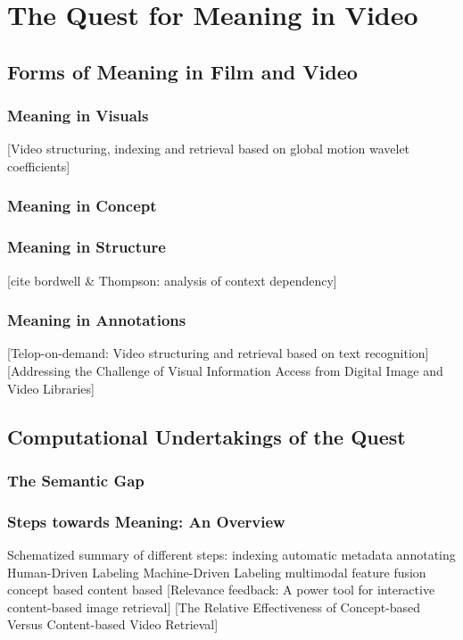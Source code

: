 \chapter{The Quest for Meaning in Video}
\label{ch:quest}

\section{Forms of Meaning in Film and Video}

\subsection{Meaning in Visuals}
[Video structuring, indexing and retrieval based on global motion wavelet coefficients]\cite{Bruno:2002tt}


\subsection{Meaning in Concept}
\subsection{Meaning in Structure}
[cite bordwell \& Thompson: analysis of context dependency]

\subsection{Meaning in Annotations}
[Telop-on-demand: Video structuring and retrieval based on text recognition]\cite{Kuwano:2000wy}
[Addressing the Challenge of Visual Information Access from Digital Image and Video Libraries]\cite{Christel:2005td}

\section{Computational Undertakings of the Quest}
\subsection{The Semantic Gap}


\subsection{Steps towards Meaning: An Overview}

Schematized summary of different steps:
indexing
automatic metadata
annotating
  Human-Driven Labeling
  Machine-Driven Labeling
multimodal feature fusion
concept based
content based [Relevance feedback: A power tool for interactive content-based image retrieval]\cite{Rui:1998uj}
[The Relative Effectiveness of Concept-based Versus Content-based Video Retrieval]\cite{Yang:2004tc}


